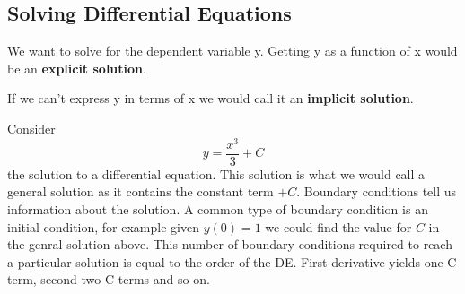 \documentclass[12pt]{article}
\begin{document}
\subsection*{Solving Differential Equations} 
We want to solve for the dependent variable y. Getting y as a function of x would be 
an \textbf{explicit solution}.

\noindent 
If we can't express y in terms of x we would call it an \textbf{implicit solution}.

\noindent 
Consider \[y = \frac{x^3}{3} + C\] the solution to a differential equation. 
This solution is what we would call a general solution as it contains the constant 
term \(+ C\). Boundary conditions tell us information about the solution.  
A common type of boundary condition is an initial condition, for example 
given \(y(0) = 1\) we could find the value for \(C\) in the genral solution above.
This number of boundary conditions required to reach a particular solution is 
equal to the order of the DE. First derivative yields one C term, second two C terms 
and so on.
 
\end{document}
